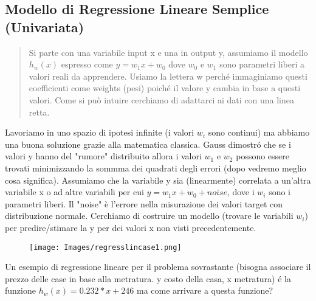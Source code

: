 \documentclass{article}
\begin{document}
\subsection{Modello di Regressione Lineare Semplice (Univariata)}
\begin{quote}
    Si parte con una variabile input x e una in output y, assumiamo il modello $h_w(x)$ espresso come $y=w_1x+w_0$ dove $w_0$ e $w_1$ sono parametri liberi a valori reali da apprendere. Usiamo la lettera w perché immaginiamo questi coefficienti come weights (pesi) poiché il valore y cambia in base a questi valori. Come si può intuire cerchiamo di adattarci ai dati con una linea retta.
\end{quote}
Lavoriamo in uno spazio di ipotesi infinite (i valori $w_i$ sono continui) ma abbiamo una buona soluzione grazie alla matematica classica. Gauss dimostró che se i valori y hanno del "rumore" distribuito allora i valori $w_1$ e $w_2$ possono essere trovati minimizzando la sommma dei quadrati degli errori (dopo vedremo meglio cosa significa). \newline
Assumiamo che la variabile y sia (linearmente) correlata a un'altra variabile x o ad altre variabili per cui $y = w_1x + w_0 + noise$, dove i $w_i$ sono i parametri liberi. Il "noise" è l'errore nella misurazione dei valori target con distribuzione normale. Cerchiamo di costruire un modello (trovare le variabili $w_i$) per predire/stimare la y per dei valori x non visti precedentemente.
\begin{figure}[H]
    \centering
    \texttt{[image: Images/regresslincase1.png]}
\end{figure}
Un esempio di regressione lineare per il problema sovrastante (bisogna associare il prezzo delle case in base alla metratura. y costo della casa, x metratura) é la funzione $h_w(x)=0.232*x+246$ ma come arrivare a questa funzione?
\end{document}
